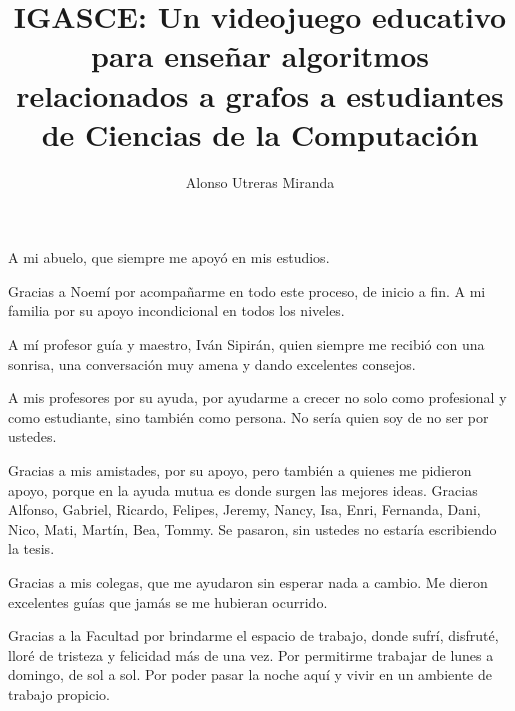 \documentclass{umemoria}
\author{Alonso Utreras Miranda}
\title{IGASCE: Un videojuego educativo para enseñar algoritmos relacionados a grafos a estudiantes de Ciencias de la Computación}
\begin{document}
\frontmatter
\maketitle

\begin{resumen}



\end{resumen}


\begin{dedicatoria}
A mi abuelo, que siempre me apoyó en mis estudios. 
\end{dedicatoria}

\begin{thanks}
    Gracias a Noemí por acompañarme en todo este proceso, de inicio a fin. A mi familia por su apoyo incondicional en todos los niveles.

    A mí profesor guía y maestro, Iván Sipirán, quien siempre me recibió con una sonrisa, una conversación muy amena y dando excelentes consejos.

    A mis profesores por su ayuda, por ayudarme a crecer no solo como profesional y como estudiante, sino también como persona. No sería quien soy de no ser por ustedes. 

    Gracias a mis amistades, por su apoyo, pero también a quienes me pidieron apoyo, porque en la ayuda mutua es donde surgen las mejores ideas. Gracias Alfonso, Gabriel, Ricardo, Felipes, Jeremy, Nancy, Isa, Enri, Fernanda, Dani, Nico, Mati, Martín, Bea, Tommy. Se pasaron, sin ustedes no estaría escribiendo la tesis. 

    Gracias a mis colegas, que me ayudaron sin esperar nada a cambio. Me dieron excelentes guías que jamás se me hubieran ocurrido.

    Gracias a la Facultad por brindarme el espacio de trabajo, donde sufrí, disfruté, lloré de tristeza y felicidad más de una vez. Por permitirme trabajar de lunes a domingo, de sol a sol. Por poder pasar la noche aquí y vivir en un ambiente de trabajo propicio.

\end{thanks}

\tableofcontents

\mainmatter










\nocite{*}








\end{document}
